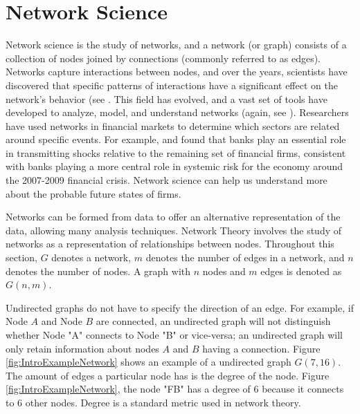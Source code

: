 
\section{Network Science} \label{sec:NetworkScience}


Network science is the study of networks, and a network (or graph) consists of a collection of nodes joined by connections (commonly referred to as edges).  Networks capture interactions between nodes, and over the years, scientists have discovered that specific patterns of interactions have a significant effect on the network's behavior (see \cite{Networks}.  This field has evolved, and a vast set of tools have developed to analyze,  model,  and understand networks (again, see \cite{Networks}).  Researchers have used networks in financial markets to determine which sectors are related around specific events.  For example,   \cite{Billio2012} and \cite{DieboldYilmaz2014}  found that banks play an essential role in transmitting shocks relative to the remaining set of financial firms,  consistent with banks playing a more central role in systemic risk for the economy around the 2007-2009 financial crisis.  Network science can help us  understand more about the probable future states of firms.

Networks can be formed from data to offer an alternative representation of the data, allowing many analysis techniques. Network Theory involves the study of networks as a representation of relationships between nodes. Throughout this section, \(G\) denotes a network, \(m\) denotes the number of edges in a network, and \(n\) denotes the number of nodes.  A graph with \(n\) nodes and \(m\) edges is denoted as \(G(n,m)\).

Undirected graphs do not have to specify the direction of an edge.  For example, if Node \(A\) and Node \(B\) are connected, an undirected graph will not distinguish whether Node "A" connects to Node "B" or vice-versa;  an undirected graph will only retain information about nodes \(A\) and \(B\) having a connection. Figure \ref{fig:IntroExampleNetwork} shows an example of a undirected graph \(G(7,16)\). The amount of edges a particular node has is the degree of the node. Figure \ref{fig:IntroExampleNetwork}, the node "FB" has a degree of 6 because it connects to 6 other nodes. Degree is a standard metric used in network theory.

